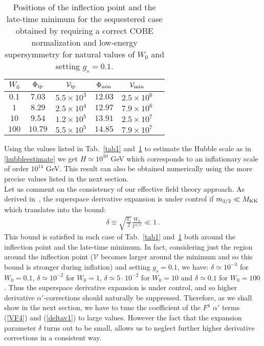 \documentclass[12pt,a4paper]{book}
\newcommand\vo{{\mathcal{V}}}
\begin{document}
\begin{table}[ht!]
\begin{center}
\begin{tabular}{cccccc}
\hline
$W_0$ & $\Phi_{\rm ip}$ & $\vo_{\rm ip}$ & $\Phi_{\rm min}$ & $\vo_{\rm min}$  \\
\hline
$0.1$ & $7.03$ & $5.5 \times 10^3$ & $12.03$  & $2.5 \times 10^{6}$ \\
\hline
$1$ & $8.29$ & $2.5 \times 10^4$ & $12.97$ & $7.9 \times 10^{6}$ \\
\hline
$10$ & $9.54$ & $1.2 \times 10^5$ & $13.91$ & $2.5 \times 10^{7}$ \\
\hline
$100$ & $10.79$ & $5.5 \times 10^5$ & $14.85$ & $7.9 \times 10^{7}$ \\
\hline
\end{tabular}
\end{center}
\caption{Positions of the inflection point and the late-time minimum for the sequestered case obtained by requiring a correct COBE normalization and low-energy supersymmetry for natural values of $W_0$ and setting $g_s=0.1$.}
\label{tab2}
\end{table}

Using the values listed in Tab.~\ref{tab1} and~\ref{tab2} to estimate the Hubble scale as in \eqref{hubbleestimate} we get $H \simeq 10^{10}$ GeV which corresponds to an inflationary scale of order $10^{14}$ GeV. This result can also be obtained numerically using the more precise values listed in the next section.\\

Let us comment on the consistency of our effective field theory approach. As derived in~\cite{Cicoli:2013swa}, the superspace derivative
expansion is under control if $m_{3/2}\ll M_{\rm KK}$ which translates into the bound:
\begin{align}
\delta \equiv \sqrt{\frac{g_s}{2}} \frac{W_0}{\vo^{1/3} } \ll 1\,.
\end{align}
This bound is satisfied in each case of Tab.~\ref{tab1} and~\ref{tab2} both around the inflection point and the late-time minimum. In fact, considering just the region around the inflection point ($\vo$ becomes larger around the minimum and so this bound is stronger during inflation) and setting $g_s=0.1$, we have: $\delta\simeq 10^{-3}$ for $W_0=0.1$, $\delta\simeq 10^{-2}$ for $W_0=1$, $\delta\simeq5\cdot 10^{-2}$ for $W_0=10$ and $\delta\simeq 0.1$ for $W_0=100$.
Thus the superspace derivative expansion is under control, and so higher derivative $\alpha'$-corrections should naturally be suppressed. Therefore, as we shall show in the next section, we have to tune the coefficient of the $F^4$ $\alpha'$ terms (\ref{VF4}) and (\ref{deltav1}) to large values. However the fact that the expansion parameter $\delta$ turns out to be small, allows us to neglect further higher derivative corrections in a consistent way. 
\end{document}
